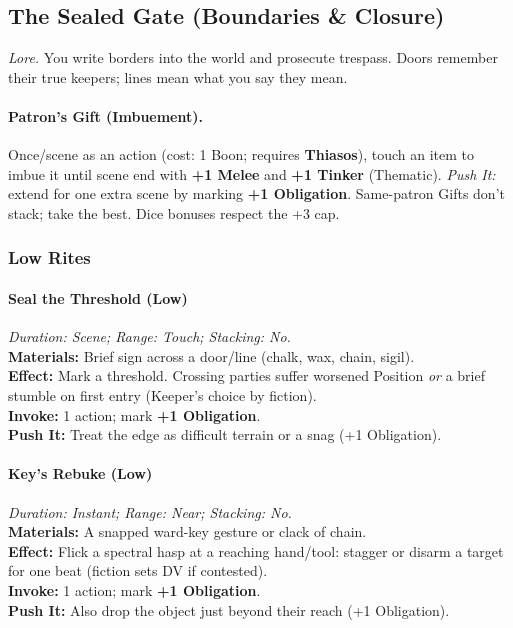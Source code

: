 
\subsection{The Sealed Gate (Boundaries \& Closure)}
\label{patron:sealed-gate}
\textit{Lore.} You write borders into the world and prosecute trespass. Doors remember their true keepers; lines mean what you say they mean.

\paragraph{Patron's Gift (Imbuement).}
Once/scene as an action (cost: 1 Boon; requires \textbf{Thiasos}), touch an item to imbue it until scene end with \textbf{+1 Melee} and \textbf{+1 Tinker} (Thematic). \emph{Push It:} extend for one extra scene by marking \textbf{+1 Obligation}. Same-patron Gifts don’t stack; take the best. Dice bonuses respect the +3 cap.

\subsubsection*{Low Rites}

\paragraph{Seal the Threshold (Low)}
\emph{Duration: Scene; Range: Touch; Stacking: No.}\\
\textbf{Materials:} Brief sign across a door/line (chalk, wax, chain, sigil).\\
\textbf{Effect:} Mark a threshold. Crossing parties suffer worsened Position \emph{or} a brief stumble on first entry (Keeper’s choice by fiction).\\
\textbf{Invoke:} 1 action; mark \textbf{+1 Obligation}.\\
\textbf{Push It:} Treat the edge as difficult terrain or a snag (+1 Obligation).

\paragraph{Key’s Rebuke (Low)}
\emph{Duration: Instant; Range: Near; Stacking: No.}\\
\textbf{Materials:} A snapped ward-key gesture or clack of chain.\\
\textbf{Effect:} Flick a spectral hasp at a reaching hand/tool: stagger or disarm a target for one beat (fiction sets DV if contested).\\
\textbf{Invoke:} 1 action; mark \textbf{+1 Obligation}.\\
\textbf{Push It:} Also drop the object just beyond their reach (+1 Obligation).

